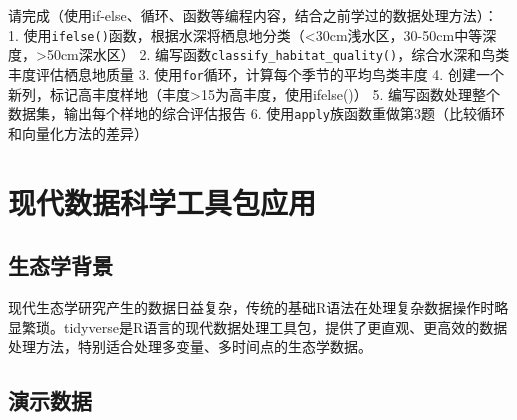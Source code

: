 \documentclass[
]{book}
\begin{document}
请完成（使用if-else、循环、函数等编程内容，结合之前学过的数据处理方法）：
1. 使用\texttt{ifelse()}函数，根据水深将栖息地分类（\textless30cm浅水区，30-50cm中等深度，\textgreater50cm深水区）
2. 编写函数\texttt{classify\_habitat\_quality()}，综合水深和鸟类丰度评估栖息地质量
3. 使用\texttt{for}循环，计算每个季节的平均鸟类丰度
4. 创建一个新列，标记高丰度样地（丰度\textgreater15为高丰度，使用ifelse()）
5. 编写函数处理整个数据集，输出每个样地的综合评估报告
6. 使用\texttt{apply}族函数重做第3题（比较循环和向量化方法的差异）

\hypertarget{ux73b0ux4ee3ux6570ux636eux79d1ux5b66ux5de5ux5177ux5305ux5e94ux7528}{%
\section{现代数据科学工具包应用}\label{ux73b0ux4ee3ux6570ux636eux79d1ux5b66ux5de5ux5177ux5305ux5e94ux7528}}

\hypertarget{ux751fux6001ux5b66ux80ccux666f-8}{%
\subsection{生态学背景}\label{ux751fux6001ux5b66ux80ccux666f-8}}

现代生态学研究产生的数据日益复杂，传统的基础R语法在处理复杂数据操作时略显繁琐。tidyverse是R语言的现代数据处理工具包，提供了更直观、更高效的数据处理方法，特别适合处理多变量、多时间点的生态学数据。

\hypertarget{ux6f14ux793aux6570ux636e-7}{%
\subsection{演示数据}\label{ux6f14ux793aux6570ux636e-7}}
\end{document}

